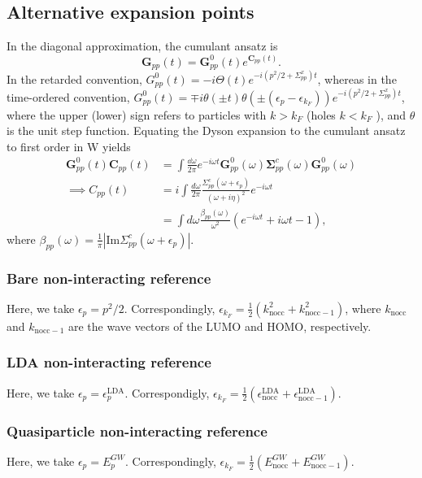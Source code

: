 \subsection{Alternative expansion points}
In the diagonal approximation, the cumulant ansatz is
\begin{equation}
    \bm{G}_{pp}(t) = \bm{G}_{pp}^{0}(t) e^{\bm{C}_{pp}(t)}.
\end{equation}
In the retarded convention, $G_{pp}^{0}(t) = -i \Theta(t) e^{-i(p^2/2 + \Sigma_{pp}^x) t}$, whereas in the time-ordered convention, $G_{pp}^{0}(t) = \mp i \theta( \pm t) \theta\left( \pm\left(\epsilon_p-\epsilon_{k_F}\right)\right) e^{-i (p^2/2 + \Sigma_{pp}^x) t}$, where the upper (lower) sign refers to particles with $k>k_F$ (holes $k<k_F$ ), and $\theta$ is the unit step function.
Equating the Dyson expansion to the cumulant ansatz to first order in W yields
\begin{align}
    \bm{G}_{pp}^{0}(t) \bm{C}_{pp}(t) &= \int \frac{\dd \omega}{2\pi} e^{-i\omega t} \bm{G}_{pp}^{0}(\omega)\bm{\Sigma}_{pp}^c(\omega)\bm{G}_{pp}^{0}(\omega) \\
\implies 	 C_{pp}(t) &= i \int \frac{d\omega}{2\pi} \frac{ \Sigma_{pp}^c\left(\omega+\epsilon_p\right)}{(\omega + i \eta)^2} e^{-i \omega t}\\
&= \int d\omega \frac{\beta_{pp}(\omega)}{\omega^2} \left( e^{-i\omega t} + i\omega t - 1 \right),
    \label{eqn:cumulant_connection}
\end{align}
where $\beta_{pp}(\omega) = \frac{1}{\pi} |\text{Im} \Sigma_{pp}^c(\omega + \epsilon_p)|$.
\subsubsection{Bare non-interacting reference }
Here, we take $\epsilon_p = p^2/2$. Correspondingly, $\epsilon_{k_F} = \frac{1}{2} \left(k_{\text{nocc}}^2 + k_{\text{nocc}-1}^2\right)$, where $k_{\text{nocc}}$ and $k_{\text{nocc}-1}$ are the wave vectors of the LUMO and HOMO, respectively. 
\subsubsection{LDA non-interacting reference }
Here, we take $\epsilon_p = \epsilon_p^{\mathrm{LDA}}$. Correspondigly, $\epsilon_{k_F} = \frac{1}{2} \left(\epsilon_{\text{nocc}}^{\mathrm{LDA}} + \epsilon_{\text{nocc}-1}^{\mathrm{LDA}}\right)$.
\subsubsection{Quasiparticle non-interacting reference }
Here, we take $\epsilon_p = E_p^{GW}$. Correspondingly, $\epsilon_{k_F} = \frac{1}{2} \left(E_{\text{nocc}}^{GW} + E_{\text{nocc}-1}^{GW}\right)$.
